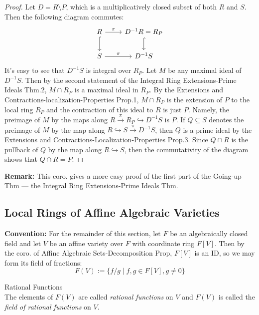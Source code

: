 \begin{proof}
    Let $D= R\setminus P$, which is a multiplicatively closed subset of both $R$ and $S$. Then the following diagram commutes:
    \[
    \begin{tikzcd}
        R \arrow[r, "\pi"] \arrow[d, hook] &D^{-1}R=R_P \arrow[d, hook]\\
        S \arrow[r, "\pi"] &D^{-1}S
    \end{tikzcd}
    \]
    It's easy to see that $D^{-1}S$ is integral over $R_P$. Let $M$ be any maximal ideal of $D^{-1}S$. Then by the second statement of the Integral Ring Extensions-Prime Ideals Thm.2, $M\cap R_P$ is a maximal ideal in $R_P$. By the Extensions and Contractions-localization-Properties Prop.1, $M \cap R_P$ is the extension of $P$ to the local ring $R_P$ and the contraction of this ideal to $R$ is just $P$. Namely, the preimage of $M$ by the maps along $R\overset{\pi}{\to} R_P \hookrightarrow D^{-1}S$ is $P$. If $Q \subseteq S$ denotes the preimage of $M$ by the map along $R \hookrightarrow S \overset{\pi}{\to} D^{-1}S$, then $Q$ is a prime ideal by the Extensions and Contractions-Localization-Properties Prop.3. Since $Q \cap R$ is the pullback of $Q$ by the map along $R \hookrightarrow S$, then the commutativity of the diagram shows that $Q \cap R=P$.
\end{proof}

\noindent\textbf{Remark:} This coro. gives a more easy proof of the first part of the Going-up Thm --- the Integral Ring Extensions-Prime Ideals Thm.

\subsection{Local Rings of Affine Algebraic Varieties}

\noindent\textbf{Convention:} For the remainder of this section, let $F$ be an algebraically closed field and let $V$ be an affine variety over $F$ with coordinate ring $F[V]$. Then by the coro. of Affine Algebraic Sets-Decomposition Prop, $F[V]$ is an ID, so we may form its field of fractions:
\[
F(V):= \{f/g \mid f,g \in F[V] ,g\neq 0\}
\]

\begin{definition}{Rational Functions}\\
The elements of $F(V)$ are called \textit{rational functions} on $V$ and $F(V)$ is called the \textit{field of rational functions} on $V$.
\end{definition}

